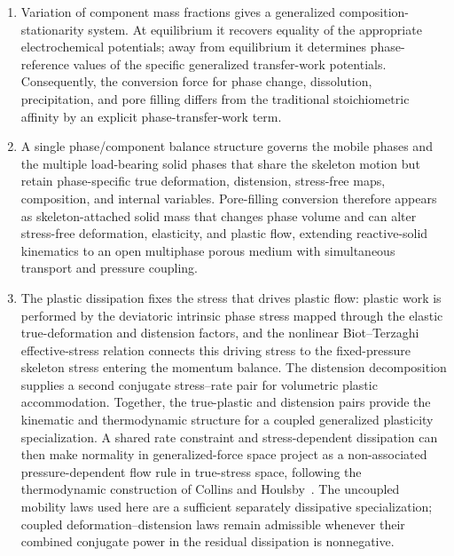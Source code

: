 \begin{enumerate}
	\item Variation of component mass fractions gives a generalized
	      composition-stationarity system.  At equilibrium it recovers equality of
	      the appropriate electrochemical potentials; away from equilibrium it
	      determines phase-reference values of the specific generalized transfer-work
	      potentials.  Consequently, the
	      conversion force for phase change, dissolution, precipitation, and pore
	      filling differs from the traditional stoichiometric affinity by an
	      explicit phase-transfer-work term.

	\item A single phase/component balance structure governs the mobile phases
	      and the multiple load-bearing solid phases that share the skeleton
	      motion but retain phase-specific true deformation, distension,
	      stress-free maps, composition, and internal variables.  Pore-filling
	      conversion therefore appears as skeleton-attached solid mass that
	      changes phase volume and can alter stress-free deformation, elasticity,
	      and plastic flow, extending reactive-solid kinematics to an open
	      multiphase porous medium with simultaneous transport and pressure
	      coupling.

	\item The plastic dissipation fixes the stress that drives plastic flow:
	      plastic work is performed by the deviatoric intrinsic phase stress
	      mapped through the elastic true-deformation and distension factors,
	      and the nonlinear Biot--Terzaghi effective-stress relation connects
	      this driving stress to the
	      fixed-pressure skeleton stress entering the momentum balance.  The
	      distension decomposition supplies a second conjugate stress--rate pair
	      for volumetric plastic accommodation.  Together, the true-plastic and
	      distension pairs provide the kinematic and thermodynamic structure for
	      a coupled generalized plasticity specialization.  A shared rate
	      constraint and stress-dependent dissipation can then make normality in
	      generalized-force space project as a non-associated pressure-dependent
	      flow rule in true-stress space, following the thermodynamic construction
	      of Collins and Houlsby~\cite{collins1997application}.  The uncoupled mobility laws
	      used here are a sufficient separately dissipative specialization;
	      coupled deformation--distension laws remain admissible whenever their
	      combined conjugate power in the residual dissipation is nonnegative.
\end{enumerate}
